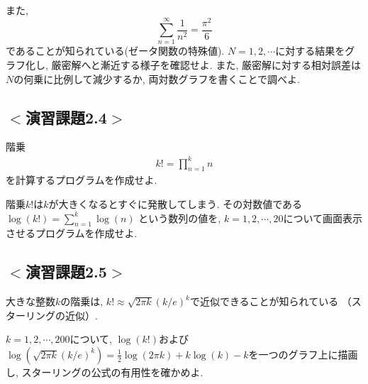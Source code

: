 また,
\begin{equation}
\sum_{n=1}^{\infty} \frac{1}{n^2}=\frac{\pi^2}{6}
\end{equation}
であることが知られている(ゼータ関数の特殊値).
$N=1, 2, \cdots$に対する結果をグラフ化し, 厳密解へと漸近する様子を確認せよ.
また, 厳密解に対する相対誤差は$N$の何乗に比例して減少するか, 両対数グラフを書くことで調べよ.

\subsection*{$<$演習課題2.4$>$}
階乗
\begin{eqnarray}
k! = \prod_{n=1}^{k} n
\end{eqnarray}
を計算するプログラムを作成せよ.

階乗$k!$は$k$が大きくなるとすぐに発散してしまう.
その対数値である$\log(k!) = \sum_{n=1}^{k} \log(n)$ という数列の値を,
$k=1,2, \cdots, 20$について画面表示させるプログラムを作成せよ. \\
\newline




\subsection*{$<$演習課題2.5$>$}
大きな整数$k$の階乗は, $k!\approx \sqrt{2\pi k}\left(k/e\right)^k$で近似できることが知られている
（スターリングの近似）.

$k=1,2, \cdots, 200$について, $\log(k!)$および$\log(\sqrt{2\pi k}\left(k/e\right)^k)=\frac{1}{2}\log(2\pi k) + k\log(k)-k$を一つのグラフ上に描画し,
スターリングの公式の有用性を確かめよ.
\newline
